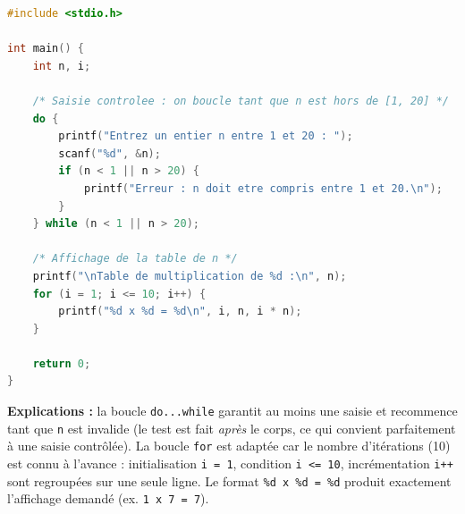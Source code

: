 \documentclass[11pt]{article}
\begin{document}
\begin{corrige}
\begin{lstlisting}[language=C]
#include <stdio.h>

int main() {
    int n, i;

    /* Saisie controlee : on boucle tant que n est hors de [1, 20] */
    do {
        printf("Entrez un entier n entre 1 et 20 : ");
        scanf("%d", &n);
        if (n < 1 || n > 20) {
            printf("Erreur : n doit etre compris entre 1 et 20.\n");
        }
    } while (n < 1 || n > 20);

    /* Affichage de la table de n */
    printf("\nTable de multiplication de %d :\n", n);
    for (i = 1; i <= 10; i++) {
        printf("%d x %d = %d\n", i, n, i * n);
    }

    return 0;
}
\end{lstlisting}
\textbf{Explications :} la boucle \texttt{do...while} garantit au moins une saisie et recommence tant que \texttt{n} est invalide (le test est fait \emph{après} le corps, ce qui convient parfaitement à une saisie contrôlée). La boucle \texttt{for} est adaptée car le nombre d'itérations (10) est connu à l'avance : initialisation \texttt{i = 1}, condition \texttt{i <= 10}, incrémentation \texttt{i++} sont regroupées sur une seule ligne. Le format \texttt{\%d x \%d = \%d} produit exactement l'affichage demandé (ex. \texttt{1 x 7 = 7}).
\end{corrige}
\end{document}
